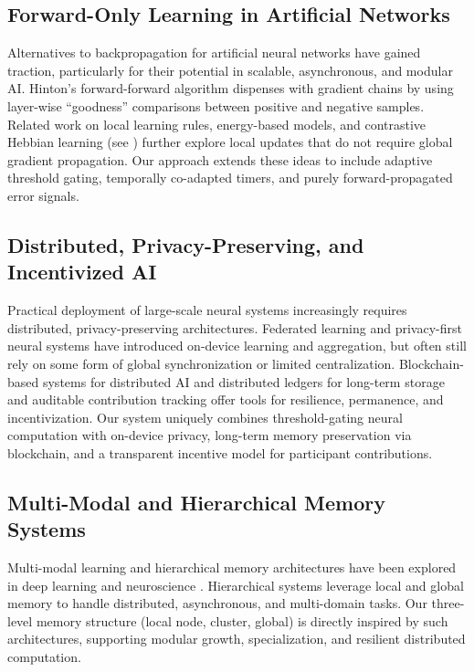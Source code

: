 \documentclass[11pt]{article}
\begin{document}
\subsection{Forward-Only Learning in Artificial Networks}
Alternatives to backpropagation for artificial neural networks have gained traction, particularly for their potential in scalable, asynchronous, and modular AI. Hinton’s forward-forward algorithm \cite{Hinton2022} dispenses with gradient chains by using layer-wise “goodness” comparisons between positive and negative samples. Related work on local learning rules, energy-based models, and contrastive Hebbian learning (see \cite{Bengio2015}) further explore local updates that do not require global gradient propagation. Our approach extends these ideas to include adaptive threshold gating, temporally co-adapted timers, and purely forward-propagated error signals.

\subsection{Distributed, Privacy-Preserving, and Incentivized AI}
Practical deployment of large-scale neural systems increasingly requires distributed, privacy-preserving architectures. Federated learning and privacy-first neural systems \cite{Kairouz2021} have introduced on-device learning and aggregation, but often still rely on some form of global synchronization or limited centralization. Blockchain-based systems for distributed AI \cite{Christidis2016} and distributed ledgers for long-term storage and auditable contribution tracking \cite{Zyskind2015} offer tools for resilience, permanence, and incentivization. Our system uniquely combines threshold-gating neural computation with on-device privacy, long-term memory preservation via blockchain, and a transparent incentive model for participant contributions.

\subsection{Multi-Modal and Hierarchical Memory Systems}
Multi-modal learning and hierarchical memory architectures have been explored in deep learning \cite{Ngiam2011, Ramachandram2017} and neuroscience \cite{Lisman2020, Sara2009}. Hierarchical systems leverage local and global memory to handle distributed, asynchronous, and multi-domain tasks. Our three-level memory structure (local node, cluster, global) is directly inspired by such architectures, supporting modular growth, specialization, and resilient distributed computation.
\end{document}
